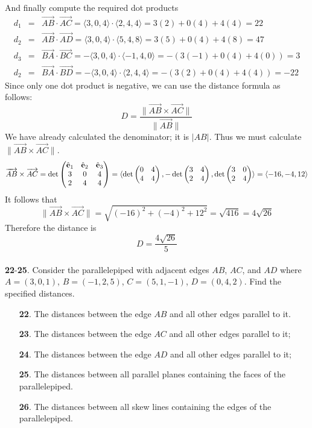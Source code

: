 \documentclass[12pt]{amsbook}
\newcommand{\la}{\langle}
\newcommand{\ra}{\rangle}
\begin{document}
And finally compute the required dot products
\begin{eqnarray*}
d_1&=&\overrightarrow{AB}\cdot\overrightarrow{AC}=\la 3,0,4 \ra \cdot \la 2,4,4 \ra = 3(2)+0(4)+4(4)=22 \\
d_2&=&\overrightarrow{AB}\cdot\overrightarrow{AD}=\la 3,0,4 \ra \cdot \la 5,4,8 \ra = 3(5)+0(4)+4(8)=47 \\
d_3&=&\overrightarrow{BA}\cdot\overrightarrow{BC}=-\la 3,0,4 \ra \cdot \la -1,4,0 \ra = -(3(-1)+0(4)+4(0))=3 \\
d_2&=&\overrightarrow{BA}\cdot\overrightarrow{BD}=-\la 3,0,4 \ra \cdot \la 2,4,4 \ra = -(3(2)+0(4)+4(4))=-22
\end{eqnarray*}
Since only one dot product is negative, we can use the distance formula as follows:
$$D=\frac{\|\overrightarrow{AB}\times\overrightarrow{AC}\|}{\|\overrightarrow{AB}\|}$$
We have already calculated the denominator; it is $|AB|$. Thus we must calculate $\|\overrightarrow{AB}\times\overrightarrow{AC}\|$.
$$\overrightarrow{AB}\times\overrightarrow{AC}=\det
\begin{pmatrix}
\hat{\bf e}_1 & \hat{\bf e}_2 & \hat{\bf e}_3\cr 3&0&4\cr 2&4&4 \end{pmatrix}=\la \det\begin{pmatrix}0&4\cr 4&4  \end{pmatrix}, -\det\begin{pmatrix}3&4\cr 2&4  \end{pmatrix}, \det\begin{pmatrix}3&0\cr 2&4 \end{pmatrix} \ra = \la -16,-4,12 \ra$$
It follows that
$$\|\overrightarrow{AB}\times\overrightarrow{AC}\|=\sqrt{(-16)^2+(-4)^2+12^2}=\sqrt{416}=4\sqrt{26}$$
Therefore the distance is
$$D=\frac{4\sqrt{26}}{5}$$
\\
{\small\bf 22}-{\small\bf 25}. Consider the parallelepiped with 
adjacent edges $AB$, $AC$, and $AD$ where 
$A=(3,0,1)$, $B=(-1,2,5)$, $C=(5,1,-1)$, $D=(0,4,2)$.
Find the specified distances.
\begin{enumerate}
\item[{\small\bf 22}.] The distances between the edge $AB$ and 
all other edges parallel to it.
\item[{\small\bf 23}.] The distances between the edge $AC$ and all other 
edges parallel to it;
\item[{\small\bf 24}.] The distances between the edge $AD$ and all other
edges parallel to it;
\item[{\small\bf 25}.]  The distances between all parallel planes containing 
the faces of the parallelepiped.
\item[{\small\bf 26}.] The distances between all skew lines containing 
the edges of the parallelepiped.
\end{enumerate}
\end{document}
